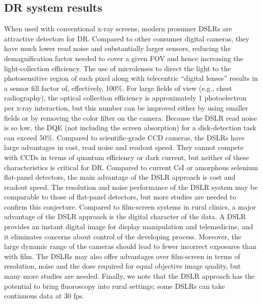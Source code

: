
\subsection{DR system results}
When used with conventional x-ray screens, modern prosumer DSLRs are attractive detectors for DR. Compared to other consumer digital cameras, they have much lower read noise and substantially larger sensors, reducing the demagnification factor needed to cover a given FOV and hence increasing the light-collection efficiency. The use of microlenses to direct the light to the photosensitive region of each pixel along with telecentric ``digital lenses'' results in a sensor fill factor of, effectively, 100\%. For large fields of view (e.g., chest radiography), the optical collection efficiency is approximately 1 photoelectron per x-ray interaction, but this number can be improved either by using smaller fields or by removing the color filter on the camera. Because the DSLR read noise is so low, the DQE (not including the screen absorption) for a disk-detection task can exceed 50\%.  Compared to scientific-grade CCD cameras, the DSLRs have large advantages in cost, read noise and readout speed.  They cannot compete with CCDs in terms of quantum efficiency or dark current, but neither of these characteristics is critical for DR.  Compared to current CsI or amorphous selenium flat-panel detectors, the main advantage of the DSLR approach is cost and readout speed. The resolution and noise performance of the DSLR system may be comparable to those of flat-panel detectors, but more studies are needed to confirm this conjecture.  Compared to film-screen systems in rural clinics, a major advantage of the DSLR approach is the digital character of the data. A DSLR provides an instant digital image for display manipulation and telemedicine, and it eliminates concerns about control of the developing process. Moreover, the large dynamic range of the cameras should lead to fewer incorrect exposures than with film. The DSLRs may also offer advantages over film-screen in terms of resolution, noise and the dose required for equal objective image quality, but many more studies are needed.  Finally, we note that the DSLR approach has the potential to bring fluoroscopy into rural settings; some DSLRs can take continuous data at 30 fps.

